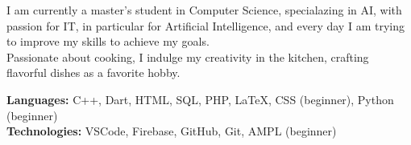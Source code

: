 \documentclass[9pt]{developercv} %
\begin{document}
\vspace{0.5cm}


\begin{minipage}[t]{0.4\textwidth} %
	\vspace{-\baselineskip} %
	I am currently a master's student in Computer Science, specialazing in AI, with passion for IT, in particular for Artificial Intelligence, and every day I am trying to improve my skills to achieve my goals. \\
	Passionate about cooking, I indulge my creativity in the kitchen, crafting flavorful dishes as a favorite hobby.
\end{minipage}
\hfill %
\begin{minipage}[t]{0.5\textwidth} %
	\vspace{-\baselineskip} %
		\textbf{Languages:} C++, Dart, HTML, SQL, PHP, LaTeX, CSS (beginner), Python (beginner) \\

		\textbf{Technologies:} VSCode, Firebase, GitHub, Git, AMPL (beginner)
\end{minipage}

\vspace{0.5cm}



\end{document}
